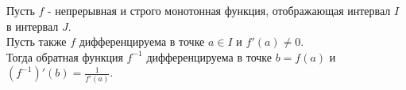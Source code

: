 

\label{sec_Definition09}
\begin{definition}
    Пусть $f$ - непрерывная и строго монотонная функция, отображающая интервал $I$ 
    в интервал $J$. \\
    Пусть также $f$ дифференцируема в точке $a \in I$ и $f'(a) \neq 0$. \\
    Тогда обратная функция $f^{-1}$ дифференцируема в точке $b = f(a)$ и 
    $(f^{-1})'(b) = \frac{1}{f'(a)}$.
\end{definition}